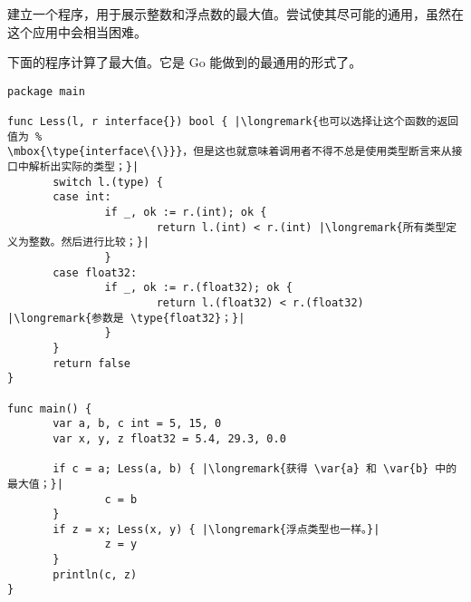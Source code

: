 \begin{Exercise}[title={接口和 max()},difficulty=5]
\Question
建立一个程序，用于展示整数和浮点数的最大值。尝试使其尽可能的通用，虽然在这个应用中会相当困难。
\end{Exercise}

\begin{Answer}
\Question
下面的程序计算了最大值。它是 Go 能做到的最通用的形式了。

\begin{lstlisting}[caption=通用的计算最大值]
package main

func Less(l, r interface{}) bool { |\longremark{也可以选择让这个函数的返回值为 %
\mbox{\type{interface\{\}}}，但是这也就意味着调用者不得不总是使用类型断言来从接口中解析出实际的类型；}|
       switch l.(type) {
       case int:
               if _, ok := r.(int); ok {
                       return l.(int) < r.(int) |\longremark{所有类型定义为整数。然后进行比较；}|
               }
       case float32:
               if _, ok := r.(float32); ok {
                       return l.(float32) < r.(float32) |\longremark{参数是 \type{float32}；}|
               }
       }
       return false
}

func main() {
       var a, b, c int = 5, 15, 0
       var x, y, z float32 = 5.4, 29.3, 0.0

       if c = a; Less(a, b) { |\longremark{获得 \var{a} 和 \var{b} 中的最大值；}|
               c = b
       }
       if z = x; Less(x, y) { |\longremark{浮点类型也一样。}|
               z = y
       }
       println(c, z)
}
\end{lstlisting}
\showremarks
\end{Answer}
